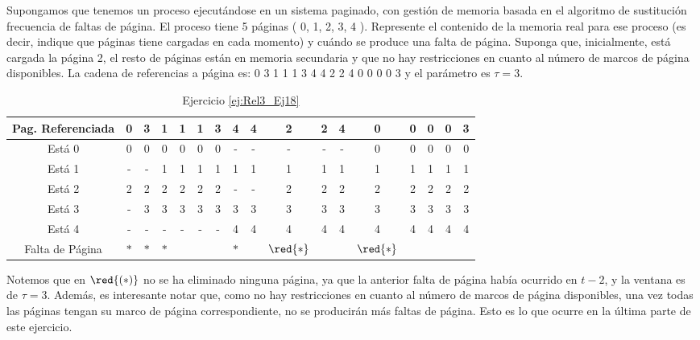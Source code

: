 \begin{ejercicio} \label{ej:Rel3_Ej18}
    Supongamos que tenemos un proceso ejecutándose en un sistema paginado, con
gestión de memoria basada en el algoritmo de sustitución frecuencia de faltas de
página. El proceso tiene 5 páginas ( 0, 1, 2, 3, 4 ). Represente el contenido de la
memoria real para ese proceso (es decir, indique que páginas tiene cargadas en cada
momento) y cuándo se produce una falta de página. Suponga que, inicialmente, está
cargada la página 2, el resto de páginas están en memoria secundaria y que no hay
restricciones en cuanto al número de marcos de página disponibles. La cadena de
referencias a página es: 0 3 1 1 1 3 4 4 2 2 4 0 0 0 0 3 y el parámetro es $\tau=3$.

    \begin{table}[H]
        \centering
        \begin{tabular}{|c|c|c|c|c|c|c|c|c|c|c|c|c|c|c|c|c|}
            Pag. Referenciada & 0 & 3 & 1 & 1 & 1 & 3 & 4 & 4 & 2 & 2 & 4 & 0 & 0 & 0 & 0 & 3 \\ \hline \hline
            Está 0            & 0 & 0 & 0 & 0 & 0 & 0 & - & - & - & - & - & 0 & 0 & 0 & 0 & 0 \\ \hline
            Está 1            & - & - & 1 & 1 & 1 & 1 & 1 & 1 & 1 & 1 & 1 & 1 & 1 & 1 & 1 & 1 \\ \hline
            Está 2            & 2 & 2 & 2 & 2 & 2 & 2 & - & - & 2 & 2 & 2 & 2 & 2 & 2 & 2 & 2 \\ \hline
            Está 3            & - & 3 & 3 & 3 & 3 & 3 & 3 & 3 & 3 & 3 & 3 & 3 & 3 & 3 & 3 & 3 \\ \hline
            Está 4            & - & - & - & - & - & - & 4 & 4 & 4 & 4 & 4 & 4 & 4 & 4 & 4 & 4 \\ \hline \hline
            Falta de Página   & $\ast$ & $\ast$ & $\ast$ &   &   &   & $\ast$ &   & $\red{\ast}$ &   &   & $\red{\ast}$ &   &   &   & 
        \end{tabular}
        \caption{Ejercicio \ref{ej:Rel3_Ej18}}
        \label{tab:Rel3_Ej18}
    \end{table}

    Notemos que en $\red{(\ast)}$ no se ha eliminado ninguna página, ya que la anterior falta de página había ocurrido en $t-2$,
    y la ventana es de $\tau=3$. Además, es interesante notar que,
    como no hay restricciones en cuanto al número de marcos de página disponibles,
    una vez todas las páginas tengan su marco de página correspondiente, no se producirán más faltas de página.
    Esto es lo que ocurre en la última parte de este ejercicio.
\end{ejercicio}




